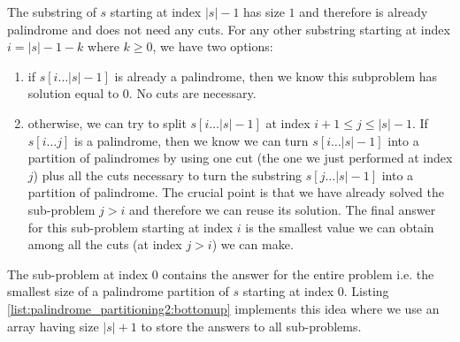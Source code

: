 The substring  of $s$ starting at index $|s|-1$ has size $1$ and therefore is already palindrome and
does not need any cuts.
For any other substring starting at index $i = |s|-1-k$ where $k \geq 0$, we
have two options:
\begin{enumerate}
	\item if $s[i \ldots |s|-1]$ is already a palindrome, then we know this subproblem has solution
	equal to $0$. No cuts are necessary.
	\item otherwise, we can try to split $s[i \ldots |s|-1]$  at index $i+1 \leq j \leq |s|-1$. 
	If	$s[i \ldots j]$ is a palindrome, then we know we can turn $s[i \ldots |s|-1]$ into a partition of
	palindromes by using one cut (the one we just performed at index $j$) plus all the cuts
	necessary to turn the substring $s[j \ldots |s|-1]$ into a partition of palindrome. The crucial
	point is that we have already solved the sub-problem  $j > i$ and therefore we
	can reuse its solution. The final answer for this sub-problem starting at index $i$ is the
	smallest value we can obtain among all the cuts (at index $j > i$) we can make.
\end{enumerate}
The sub-problem at index $0$ contains the answer for the entire problem i.e. the smallest size of a
palindrome partition of $s$ starting at index $0$.
Listing \ref{list:palindrome_partitioning2:bottomup} implements this idea where we use an array 
having size $|s|+1$ to store the answers to all sub-problems.


